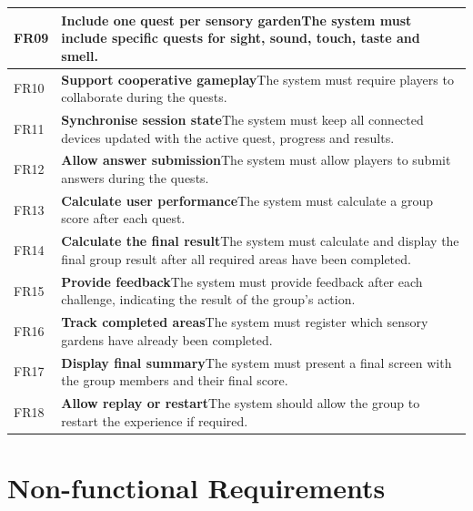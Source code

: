 \begin{longtable}{|l|p{}|}
\hline
FR09 & \textbf{Include one quest per sensory garden}\newline The system must include specific quests for sight, sound, touch, taste and smell. \\
\hline
FR10 & \textbf{Support cooperative gameplay}\newline The system must require players to collaborate during the quests. \\
\hline
FR11 & \textbf{Synchronise session state}\newline The system must keep all connected devices updated with the active quest, progress and results. \\
\hline
FR12 & \textbf{Allow answer submission}\newline The system must allow players to submit answers during the quests. \\
\hline
FR13 & \textbf{Calculate user performance}\newline The system must calculate a group score after each quest. \\
\hline
FR14 & \textbf{Calculate the final result}\newline The system must calculate and display the final group result after all required areas have been completed. \\
\hline
FR15 & \textbf{Provide feedback}\newline The system must provide feedback after each challenge, indicating the result of the group's action. \\
\hline
FR16 & \textbf{Track completed areas}\newline The system must register which sensory gardens have already been completed. \\
\hline
FR17 & \textbf{Display final summary}\newline The system must present a final screen with the group members and their final score. \\
\hline
FR18 & \textbf{Allow replay or restart}\newline The system should allow the group to restart the experience if required. \\
\hline

\end{longtable}

\section{Non-functional Requirements}

\renewcommand{\arraystretch}{1}

